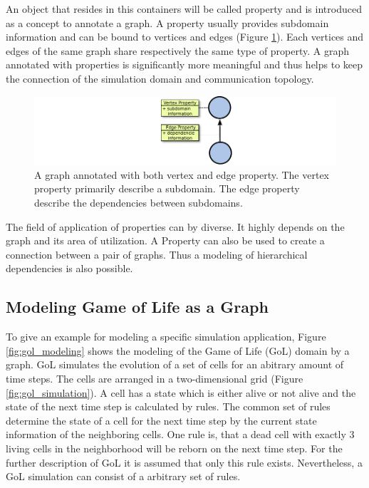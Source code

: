 An object that resides in this containers will be called property and
is introduced as a concept to annotate a graph. A property usually
provides subdomain information and can be bound to vertices and edges
(Figure \ref{fig:property}). Each vertices and edges of the same graph
share respectively the same type of property. A graph annotated with
properties is significantly more meaningful and thus helps to keep the
connection of the simulation domain and communication topology.

\begin{figure}[H]
  \centering \includegraphics[width=\textwidth]{graphics/30_property}
  \caption{A graph annotated with both vertex and edge property. The vertex
    property primarily describe a subdomain. The edge property
    describe the dependencies between subdomains.}
  \label{fig:property}
\end{figure}

The field of application of properties can by diverse. It highly
depends on the graph and its area of utilization.  A Property can also
be used to create a connection between a pair of graphs. Thus a
modeling of hierarchical dependencies is also possible.


\subsection{Modeling Game of Life as a Graph}
\label{sec:gol}
To give an example for modeling a specific simulation application,
Figure \ref{fig:gol_modeling} shows the modeling of the Game of Life
(GoL) \cite{ref:gol} domain by a graph. GoL simulates the evolution of
a set of cells for an abitrary amount of time steps. The cells are
arranged in a two-dimensional grid (Figure \ref{fig:gol_simulation}).
A cell has a state which is either alive or not alive and the state of
the next time step is calculated by rules.  The common set of rules
determine the state of a cell for the next time step by the current
state information of the neighboring cells.  One rule is, that a dead
cell with exactly 3 living cells in the neighborhood will be reborn on
the next time step. For the further description of GoL it is assumed
that only this rule exists.  Nevertheless, a GoL simulation can consist
of a arbitrary set of rules.

